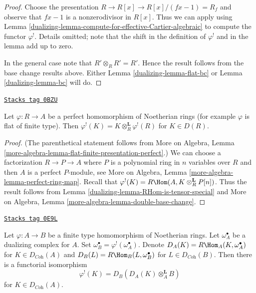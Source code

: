 \begin{proof}

Choose the presentation $R \to R[x] \to R[x]/(fx - 1) = R_f$ and observe
that $fx - 1$ is a nonzerodivisor in $R[x]$. Thus we can apply
using Lemma \ref{dualizing-lemma-compute-for-effective-Cartier-algebraic}
to compute the functor $\varphi^!$. Details omitted;
note that the shift in the definition
of $\varphi^!$ and in the lemma add up to zero.

\medskip\noindent
In the general case note that $R' \otimes_R R' = R'$.
Hence the result follows from the base change results
above. Either Lemma \ref{dualizing-lemma-flat-bc} or
Lemma \ref{dualizing-lemma-bc} will do.
\end{proof}

\begin{lemma}
\label{dualizing-lemma-upper-shriek-is-tensor-functor}
\href{https://stacks.math.columbia.edu/tag/0BZU}{\texttt{Stacks tag 0BZU}}

Let $\varphi : R \to A$ be a perfect homomorphism of Noetherian rings
(for example $\varphi$ is flat of finite type).
Then $\varphi^!(K) = K \otimes_R^\mathbf{L} \varphi^!(R)$
for $K \in D(R)$.
\end{lemma}

\begin{proof}

(The parenthetical statement follows from
More on Algebra, Lemma
\ref{more-algebra-lemma-flat-finite-presentation-perfect}.)
We can choose a factorization $R \to P \to A$ where $P$ is a polynomial
ring in $n$ variables over $R$ and then $A$ is a perfect $P$-module, see
More on Algebra, Lemma \ref{more-algebra-lemma-perfect-ring-map}.
Recall that $\varphi^!(K) = R\Hom(A, K \otimes_R^\mathbf{L} P[n])$.
Thus the result follows from
Lemma \ref{dualizing-lemma-RHom-is-tensor-special}
and More on Algebra, Lemma \ref{more-algebra-lemma-double-base-change}.
\end{proof}

\begin{lemma}
\label{dualizing-lemma-relative-dualizing-if-have-omega}
\href{https://stacks.math.columbia.edu/tag/0E9L}{\texttt{Stacks tag 0E9L}}

Let $\varphi : A \to B$ be a finite type homomorphism of Noetherian rings.
Let $\omega_A^\bullet$ be a dualizing complex for $A$. Set
$\omega_B^\bullet = \varphi^!(\omega_A^\bullet)$. Denote
$D_A(K) = R\Hom_A(K, \omega_A^\bullet)$ for $K \in D_{\textit{Coh}}(A)$
and
$D_B(L) = R\Hom_B(L, \omega_B^\bullet)$ for $L \in D_{\textit{Coh}}(B)$.
Then there is a functorial isomorphism
$$
\varphi^!(K) = D_B(D_A(K) \otimes_A^\mathbf{L} B)
$$
for $K \in D_{\textit{Coh}}(A)$.
\end{lemma}

